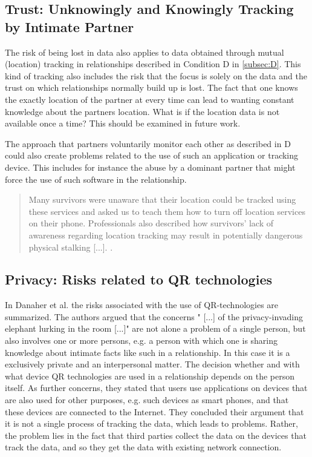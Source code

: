 \subsection{Trust: Unknowingly and Knowingly Tracking by Intimate Partner}
The risk of being lost in data also applies to data obtained through mutual (location) tracking in relationships described in Condition D in \ref{subsec:D}. This kind of tracking also includes the risk that the focus is solely on the data and the trust on which relationships normally build up is lost. The fact that one knows the exactly location of the partner at every time can lead to wanting constant knowledge about the partners location. What is if the location data is not available once a time? This should be examined in future work.


The approach that partners voluntarily monitor each other as described in D could also create problems related to the use of such an application or tracking device.
This includes for instance the abuse by a dominant partner that might force the use of such software in the relationship.
\begin{quote}
Many survivors were unaware that their location could be tracked using these services and asked us to teach them how to turn off location services on their phone. Professionals also described how survivors' lack of awareness regarding location tracking may result in potentially dangerous physical stalking [...]. \cite{freed2018stalker}.
\end{quote}


\subsection{Privacy: Risks related to \acs{QR} technologies}
In Danaher et al. \cite{doi:10.1080/15265161.2017.1422294} the risks associated with the use of \acs{QR}-technologies are summarized.
The authors argued that the concerns " [...] of the privacy-invading elephant lurking in the room [...]" are not alone a problem of a single person, but also involves one or more persons, e.g. a person with which one is sharing knowledge about intimate facts like such in a relationship. In this case it is a exclusively private and an interpersonal matter. The decision whether and with what device \acs{QR} technologies are used in a relationship depends on the person itself.
As further concerns, they stated that users use applications on devices that are also used for other purposes, e.g. such devices as smart phones, and that these devices are connected to the Internet. 
They concluded their argument that it is not a single process of tracking the data, which leads to problems. Rather, the problem lies in the fact that third parties collect the data on the devices that track the data, and so they get the data with existing network connection.

